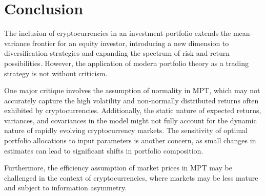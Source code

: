 \documentclass[12pt,a4paper]{article}
\begin{document}
\section{Conclusion}\label{sec:discussion}
The inclusion of cryptocurrencies in an investment portfolio extends the mean-variance frontier for an equity investor, 
introducing a new dimension to diversification strategies and expanding the spectrum of risk and return possibilities. 
However, the application of modern portfolio theory as a trading strategy is not without criticism. 

\noindent One major critique involves the assumption of normality in MPT, which may not accurately capture the high volatility 
and non-normally distributed returns often exhibited by cryptocurrencies. Additionally, the static nature of expected returns,
 variances, and covariances in the model might not fully account for the dynamic nature of rapidly evolving cryptocurrency 
 markets. The sensitivity of optimal portfolio allocations to input parameters is another concern, as small changes in 
 estimates can lead to significant shifts in portfolio composition.

\noindent Furthermore, the efficiency assumption of market prices in MPT may be challenged in the context of cryptocurrencies, 
where markets may be less mature and subject to information asymmetry.

\clearpage
{}


\end{document}
